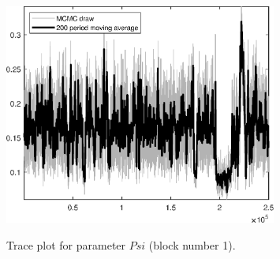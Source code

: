 \begin{figure}[H]
\centering
  \includegraphics[width=0.8\textwidth]{directed_search_est/graphs/TracePlot_Psi_blck_1}\\
    \caption{Trace plot for parameter $Psi$ (block number 1).}
\end{figure}
